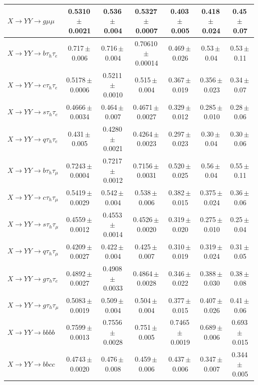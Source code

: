 \documentclass[12pt]{article}   %
\begin{document}
\begin{landscape}
{\begin{longtable}{@{\extracolsep{\fill}}lcccccc@{}}
$X\to YY\to g\mu\mu$ & 0.5310\,$\pm$\,0.0021 & 0.536\,$\pm$\,0.004 & 0.5327\,$\pm$\,0.0007 & 0.403\,$\pm$\,0.005 & 0.418\,$\pm$\,0.024 & 0.45\,$\pm$\,0.07 \\
\midrule
$X\to YY\to b\tau_h\tau_e$ & 0.717\,$\pm$\,0.006 & 0.716\,$\pm$\,0.004 & 0.70610\,$\pm$\,0.00014 & 0.469\,$\pm$\,0.026 & 0.53\,$\pm$\,0.04 & 0.53\,$\pm$\,0.11 \\
$X\to YY\to c\tau_h\tau_e$ & 0.5178\,$\pm$\,0.0006 & 0.5211\,$\pm$\,0.0010 & 0.515\,$\pm$\,0.004 & 0.367\,$\pm$\,0.019 & 0.356\,$\pm$\,0.023 & 0.34\,$\pm$\,0.07 \\
$X\to YY\to s\tau_h\tau_e$ & 0.4666\,$\pm$\,0.0034 & 0.464\,$\pm$\,0.007 & 0.4671\,$\pm$\,0.0027 & 0.329\,$\pm$\,0.012 & 0.285\,$\pm$\,0.010 & 0.28\,$\pm$\,0.06 \\
$X\to YY\to q\tau_h\tau_e$ & 0.431\,$\pm$\,0.005 & 0.4280\,$\pm$\,0.0021 & 0.4264\,$\pm$\,0.0023 & 0.297\,$\pm$\,0.023 & 0.30\,$\pm$\,0.04 & 0.30\,$\pm$\,0.06 \\
$X\to YY\to b\tau_h\tau_\mu$ & 0.7243\,$\pm$\,0.0004 & 0.7217\,$\pm$\,0.0012 & 0.7156\,$\pm$\,0.0031 & 0.520\,$\pm$\,0.025 & 0.56\,$\pm$\,0.04 & 0.55\,$\pm$\,0.11 \\
$X\to YY\to c\tau_h\tau_\mu$ & 0.5419\,$\pm$\,0.0029 & 0.542\,$\pm$\,0.004 & 0.538\,$\pm$\,0.006 & 0.382\,$\pm$\,0.015 & 0.375\,$\pm$\,0.024 & 0.36\,$\pm$\,0.06 \\
$X\to YY\to s\tau_h\tau_\mu$ & 0.4559\,$\pm$\,0.0012 & 0.4553\,$\pm$\,0.0014 & 0.4526\,$\pm$\,0.0020 & 0.319\,$\pm$\,0.020 & 0.275\,$\pm$\,0.010 & 0.25\,$\pm$\,0.04 \\
$X\to YY\to q\tau_h\tau_\mu$ & 0.4209\,$\pm$\,0.0027 & 0.422\,$\pm$\,0.004 & 0.425\,$\pm$\,0.007 & 0.310\,$\pm$\,0.019 & 0.319\,$\pm$\,0.024 & 0.31\,$\pm$\,0.05 \\
$X\to YY\to g\tau_h\tau_e$ & 0.4892\,$\pm$\,0.0027 & 0.4908\,$\pm$\,0.0033 & 0.4864\,$\pm$\,0.0028 & 0.346\,$\pm$\,0.022 & 0.388\,$\pm$\,0.030 & 0.38\,$\pm$\,0.08 \\
$X\to YY\to g\tau_h\tau_\mu$ & 0.5083\,$\pm$\,0.0019 & 0.509\,$\pm$\,0.004 & 0.504\,$\pm$\,0.004 & 0.377\,$\pm$\,0.015 & 0.407\,$\pm$\,0.026 & 0.41\,$\pm$\,0.06 \\
\midrule
$X\to YY\to bbbb$ & 0.7599\,$\pm$\,0.0013 & 0.7556\,$\pm$\,0.0028 & 0.751\,$\pm$\,0.005 & 0.7465\,$\pm$\,0.0019 & 0.689\,$\pm$\,0.006 & 0.693\,$\pm$\,0.015 \\
$X\to YY\to bbcc$ & 0.4743\,$\pm$\,0.0020 & 0.476\,$\pm$\,0.008 & 0.459\,$\pm$\,0.006 & 0.437\,$\pm$\,0.006 & 0.347\,$\pm$\,0.007 & 0.344\,$\pm$\,0.005 \\

\end{longtable}}
\end{landscape}
\end{document}
